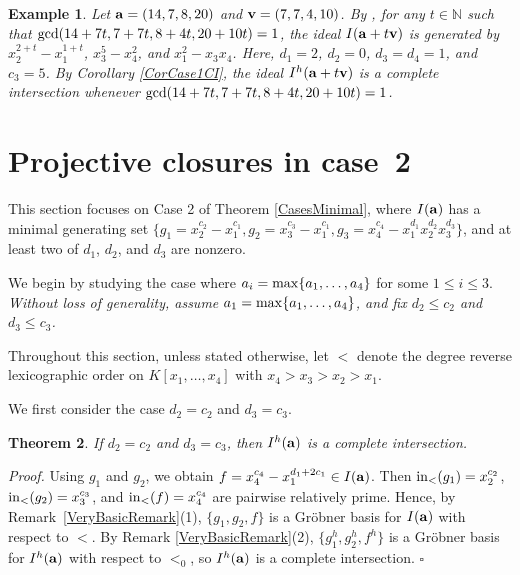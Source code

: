 \documentclass[10pt]{amsart}
\newtheorem{thm1}{Theorem}[section]
\newtheorem{ex1}[thm1]{Example}
\begin{document}
\begin{ex1} {\rm Let ${\bf a}=(14, 7, 8, 20)$ and ${\bf v}=(7,7,4,10)$. By \cite[Theorem 2.6]{Katsa}, for any $t \in \mathbb{N}$ such that ${\rm gcd}(14+7t,7+7t,8+4t,20+10t)=1$, the ideal $I({\bf a}+t{\bf v})$ is generated by $x_{2}^{2+t}-x_{1}^{1+t}$, $x_{3}^{5}-x_{4}^{2}$, and $x_{1}^{2}-x_{3}x_{4}$. Here, $d_1=2$, $d_2=0$, $d_3=d_4=1$, and $c_3=5$. By Corollary \ref{CorCase1CI}, the ideal $I^{h}({\bf a}+t{\bf v})$ is a complete intersection whenever ${\rm gcd}(14+7t,7+7t,8+4t,20+10t)=1$.}
\end{ex1}




\section{Projective closures in case~2}

This section focuses on Case 2 of Theorem \ref{CasesMinimal}, where $I({\bf a})$ has a minimal generating set $\{g_{1}=x_{2}^{c_2}-x_{1}^{c_1}, g_{2}=x_{3}^{c_3}-x_{1}^{c_1}, g_{3}=x_{4}^{c_4}-x_{1}^{d_1}x_{2}^{d_2}x_{3}^{d_3}\}$, and at least two of $d_1$, $d_2$, and $d_3$ are nonzero.

We begin by studying the case where $a_{i} = {\rm max}\{a_1,\ldots,a_4\}$ for some $1 \leq i \leq 3$. {\em Without loss of generality, assume $a_1={\rm max}\{a_1,\ldots,a_4\}$, and fix $d_{2} \leq c_2$ and $d_{3} \leq c_3$.}

Throughout this section, unless stated otherwise, let $<$ denote the degree
reverse lexicographic order on $K[x_1,\ldots,x_4]$ with
$x_4>x_3>x_2>x_1$.

We first consider the case $d_2=c_{2}$ and $d_{3}=c_3$.

\begin{thm1} \label{Veryfirst} If $d_2=c_{2}$ and $d_{3}=c_3$, then $I^{h}({\bf a})$ is a complete intersection.
\end{thm1}

{\em \noindent Proof.} Using $g_1$ and $g_2$, we obtain $f=x_{4}^{c_4}-x_{1}^{d_1+2c_1} \in I({\bf a})$. Then ${\rm in}_{<}(g_1)=x_{2}^{c_2}$, ${\rm in}_{<}(g_2)=x_{3}^{c_3}$, and ${\rm in}_{<}(f)=x_{4}^{c_4}$ are pairwise relatively prime. Hence, by Remark~\ref{VeryBasicRemark}(1), $\{g_1, g_2, f\}$ is a Gr\"obner basis for $I({\bf a})$ with respect to $<$. By Remark \ref{VeryBasicRemark}(2), $\{g_{1}^{h}, g_{2}^{h}, f^{h}\}$ is a Gr\"obner basis for $I^{h}({\bf a})$ with respect to $<_{0}$, so $I^{h}({\bf a})$ is a complete intersection. \hfill $\square$ \par\vspace{0.5\baselineskip}
\end{document}
